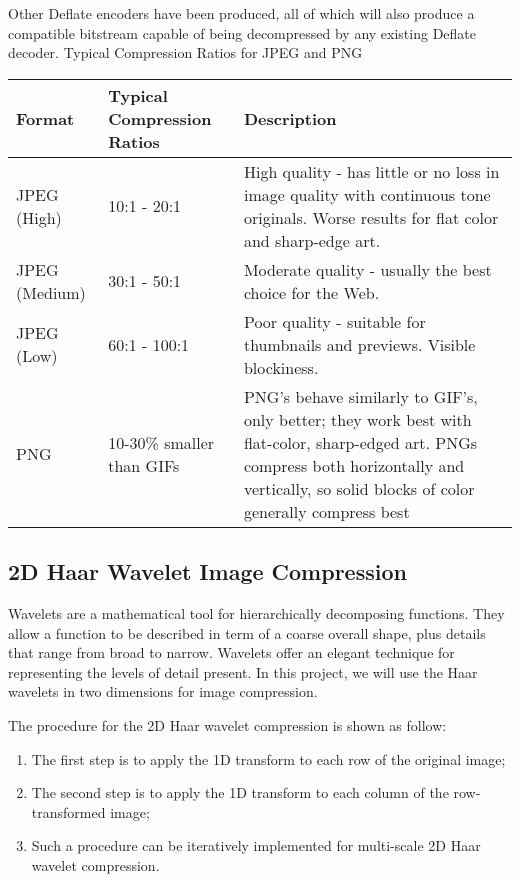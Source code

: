Other Deflate encoders have been produced, all of which will also produce a compatible bitstream capable of being decompressed by any existing Deflate decoder. 
Typical Compression Ratios for JPEG and PNG

\begin{table*}
\begin{tabular}{|l||l|p{18em}|}\hline
Format		& Typical Compression Ratios 	& Description \\\hline
JPEG (High)	& 10:1 - 20:1 			& High quality - has little or no  loss in image quality with continuous tone originals. Worse results for flat color and sharp-edge art.\\\hline
JPEG (Medium)	& 30:1 - 50:1			& Moderate quality - usually the best choice for the Web.\\\hline
JPEG (Low) 	& 60:1 - 100:1			& Poor quality - suitable for thumbnails and previews. Visible blockiness.\\\hline
PNG 		& 10-30\% smaller than GIFs	& PNG's behave similarly to GIF's, only better; they work best with flat-color, sharp-edged art. PNGs compress both horizontally and vertically, so solid blocks of color generally compress best \\\hline
\end{tabular}
\end{table*}


\subsection{2D Haar Wavelet Image Compression}
Wavelets are a mathematical tool for hierarchically decomposing functions. They allow a function to be described in term of a coarse overall shape, plus details that range from broad to narrow. Wavelets offer an elegant technique for representing the levels of detail present. In this project, we will use the Haar wavelets in two dimensions for image compression.

The procedure for the 2D Haar wavelet compression is shown as follow:
\begin{enumerate}
\item The first step is to apply the 1D transform to each row of the original image;
\item  The second step is to apply the 1D transform to each column of the 
row-transformed image;
\item Such a procedure can be iteratively implemented for multi-scale 2D Haar wavelet 
compression.
\end{enumerate}

